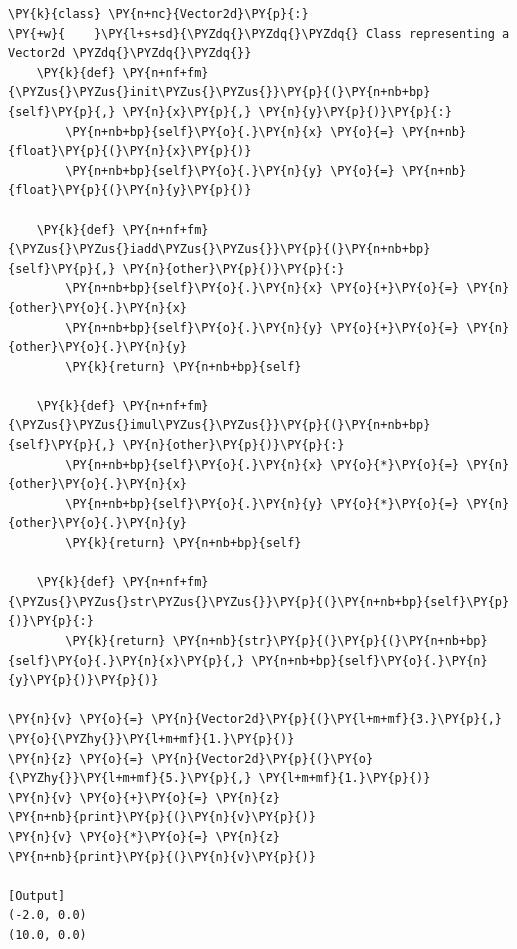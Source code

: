 \begin{Verbatim}[label=\makebox{\url{https://github.com/lucabaldini/cmepda/tree/master/slides/latex/snippets/vector2d\_inplace.py}},commandchars=\\\{\}]
\PY{k}{class} \PY{n+nc}{Vector2d}\PY{p}{:}
\PY{+w}{    }\PY{l+s+sd}{\PYZdq{}\PYZdq{}\PYZdq{} Class representing a Vector2d \PYZdq{}\PYZdq{}\PYZdq{}}   
    \PY{k}{def} \PY{n+nf+fm}{\PYZus{}\PYZus{}init\PYZus{}\PYZus{}}\PY{p}{(}\PY{n+nb+bp}{self}\PY{p}{,} \PY{n}{x}\PY{p}{,} \PY{n}{y}\PY{p}{)}\PY{p}{:}
        \PY{n+nb+bp}{self}\PY{o}{.}\PY{n}{x} \PY{o}{=} \PY{n+nb}{float}\PY{p}{(}\PY{n}{x}\PY{p}{)}
        \PY{n+nb+bp}{self}\PY{o}{.}\PY{n}{y} \PY{o}{=} \PY{n+nb}{float}\PY{p}{(}\PY{n}{y}\PY{p}{)}
    
    \PY{k}{def} \PY{n+nf+fm}{\PYZus{}\PYZus{}iadd\PYZus{}\PYZus{}}\PY{p}{(}\PY{n+nb+bp}{self}\PY{p}{,} \PY{n}{other}\PY{p}{)}\PY{p}{:}
        \PY{n+nb+bp}{self}\PY{o}{.}\PY{n}{x} \PY{o}{+}\PY{o}{=} \PY{n}{other}\PY{o}{.}\PY{n}{x}
        \PY{n+nb+bp}{self}\PY{o}{.}\PY{n}{y} \PY{o}{+}\PY{o}{=} \PY{n}{other}\PY{o}{.}\PY{n}{y}
        \PY{k}{return} \PY{n+nb+bp}{self}
        
    \PY{k}{def} \PY{n+nf+fm}{\PYZus{}\PYZus{}imul\PYZus{}\PYZus{}}\PY{p}{(}\PY{n+nb+bp}{self}\PY{p}{,} \PY{n}{other}\PY{p}{)}\PY{p}{:}
        \PY{n+nb+bp}{self}\PY{o}{.}\PY{n}{x} \PY{o}{*}\PY{o}{=} \PY{n}{other}\PY{o}{.}\PY{n}{x}
        \PY{n+nb+bp}{self}\PY{o}{.}\PY{n}{y} \PY{o}{*}\PY{o}{=} \PY{n}{other}\PY{o}{.}\PY{n}{y}
        \PY{k}{return} \PY{n+nb+bp}{self}
        
    \PY{k}{def} \PY{n+nf+fm}{\PYZus{}\PYZus{}str\PYZus{}\PYZus{}}\PY{p}{(}\PY{n+nb+bp}{self}\PY{p}{)}\PY{p}{:}
        \PY{k}{return} \PY{n+nb}{str}\PY{p}{(}\PY{p}{(}\PY{n+nb+bp}{self}\PY{o}{.}\PY{n}{x}\PY{p}{,} \PY{n+nb+bp}{self}\PY{o}{.}\PY{n}{y}\PY{p}{)}\PY{p}{)}
     
\PY{n}{v} \PY{o}{=} \PY{n}{Vector2d}\PY{p}{(}\PY{l+m+mf}{3.}\PY{p}{,} \PY{o}{\PYZhy{}}\PY{l+m+mf}{1.}\PY{p}{)}
\PY{n}{z} \PY{o}{=} \PY{n}{Vector2d}\PY{p}{(}\PY{o}{\PYZhy{}}\PY{l+m+mf}{5.}\PY{p}{,} \PY{l+m+mf}{1.}\PY{p}{)}
\PY{n}{v} \PY{o}{+}\PY{o}{=} \PY{n}{z}
\PY{n+nb}{print}\PY{p}{(}\PY{n}{v}\PY{p}{)}
\PY{n}{v} \PY{o}{*}\PY{o}{=} \PY{n}{z}
\PY{n+nb}{print}\PY{p}{(}\PY{n}{v}\PY{p}{)}

[Output]
(-2.0, 0.0)
(10.0, 0.0)
\end{Verbatim}
